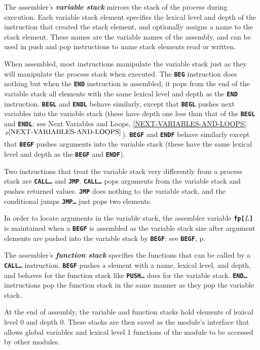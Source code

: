 \documentclass[12pt]{article}
\newcommand{\TT}[1]{{\tt \bfseries #1}}
\newcommand{\key}[1]{{\bf \em #1}\index{#1}}
\newcommand{\itemref}[1]{\ref{#1}$\,^{p\pageref{#1}}$}
\newcommand{\pagref}[1]{p\pageref{#1}}
\begin{document}
The assembler's \key{variable stack} mirrors the stack of
the process during execution.  Each variable stack
element specifies the lexical level and depth of the
instruction that created the stack element, and optionally
assigns a name to the stack element.  These names are the
variable names of the assembly, and can be used in
push and pop instructions to name stack elements read or
written.

When assembled, most instructions manipulate the variable
stack just as they will manipulate the process stack
when executed.  The \TT{BEG} instruction does nothing
but when the \TT{END} instruction is assembled, it pops
from the end of the variable stack all elements with
the same lexical level and depth as the \TT{END} instruction.
\TT{BEGL} and \TT{ENDL} behave similarly, except that
\TT{BEGL} pushes next variables into the variable stack
(these have depth one less
than that of the \TT{BEGL} and \TT{ENDL}: see Next Variables and Loops,
\itemref{NEXT-VARIABLES-AND-LOOPS}).
\TT{BEGF} and \TT{ENDF} behave similarly except that \TT{BEGF}
pushes arguments into the variable stack (these have the same
lexical level and depth as the \TT{BEGF} and \TT{ENDF}).

Two instructions that treat the variable stack very differently
from a process stack are \TT{CALL\ldots} and \TT{JMP}.  \TT{CALL\ldots}
pops arguments from the variable stack and pushes returned values.
\TT{JMP} does nothing to the variable stack, and the conditional
jumps \TT{JMP\ldots} just pops two elements.

In order to locate arguments in the variable stack, the assembler variable
\TT{fp[$L$]} is maintained when a \TT{BEGF} is assembled as the
variable stack size after argument elements are pushed into the
variable stack by \TT{BEGF}: see \TT{BEGF}, \pagref{BEGF}.

The assembler's \key{function stack} specifies the functions that
can be called by a \TT{CALL\ldots} instruction.  \TT{BEGF} pushes
a element with a name, lexical level, and depth, and behaves
for the function stack like \TT{PUSH\ldots} does for the variable stack.
\TT{END\ldots} instructions pop the function stack in the same manner as
they pop the variable stack.

At the end of assembly, the variable and function stacks hold
elements of lexical level 0 and depth 0.  These stacks are then
saved as the module's interface that allows global variables
and lexical level 1 functions of the module to be accessed by
other modules.
\end{document}

